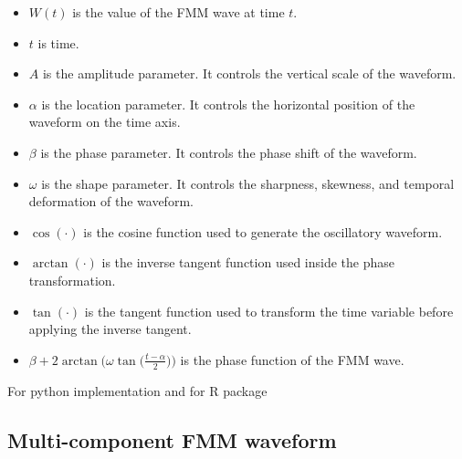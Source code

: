 \documentclass[a4paper]{article}
\begin{document}
            \begin{itemize}
                \item $W(t)$ is the value of the FMM wave at time $t$.
                
                \item $t$ is time.
                
                \item $A$ is the amplitude parameter. It controls the vertical scale of the waveform.
                
                \item $\alpha$ is the location parameter. It controls the horizontal position of the waveform on the time axis.
                
                \item $\beta$ is the phase parameter. It controls the phase shift of the waveform.
                
                \item $\omega$ is the shape parameter. It controls the sharpness, skewness, and temporal deformation of the waveform.
                
                \item $\cos(\cdot)$ is the cosine function used to generate the oscillatory waveform.
                
                \item $\arctan(\cdot)$ is the inverse tangent function used inside the phase transformation.
                
                \item $\tan(\cdot)$ is the tangent function used to transform the time variable before applying the inverse tangent.
                
                \item $\beta + 2 \arctan\bigl(\omega \tan\bigl(\frac{t-\alpha}{2}\bigr)\bigr)$ is the phase function of the FMM wave.
            \end{itemize}
            For python implementation  and for R package 
        
        \subsection{Multi-component FMM waveform}
            
\end{document}
